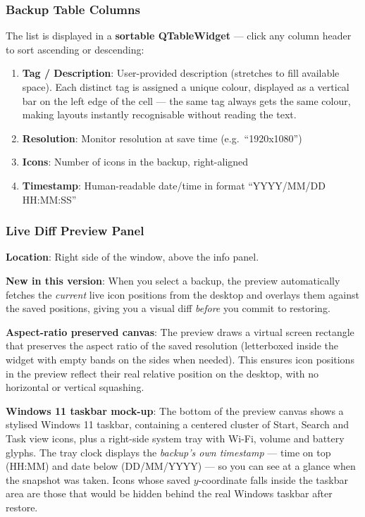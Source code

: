 \documentclass[a4paper,11pt]{article}
\begin{document}
\subsubsection{Backup Table Columns}

The list is displayed in a \textbf{sortable QTableWidget} --- click any
column header to sort ascending or descending:

\begin{enumerate}
  \item \textbf{Tag / Description}: User-provided description
    (stretches to fill available space). Each distinct tag is assigned a
    unique colour, displayed as a vertical bar on the left edge of the cell
    --- the same tag always gets the same colour, making layouts instantly
    recognisable without reading the text.
  \item \textbf{Resolution}: Monitor resolution at save time
    (e.g.\ ``1920x1080'')
  \item \textbf{Icons}: Number of icons in the backup, right-aligned
  \item \textbf{Timestamp}: Human-readable date/time in format
    ``YYYY/MM/DD HH:MM:SS''
\end{enumerate}

\subsubsection{Live Diff Preview Panel}

\textbf{Location}: Right side of the window, above the info panel.

\textbf{New in this version}: When you select a backup, the preview
automatically fetches the \textit{current} live icon positions from the
desktop and overlays them against the saved positions, giving you a
visual diff \textit{before} you commit to restoring.

\textbf{Aspect-ratio preserved canvas}: The preview draws a
virtual screen rectangle that preserves the aspect ratio of the saved
resolution (letterboxed inside the widget with empty bands on the sides
when needed). This ensures icon positions in the preview reflect their
real relative position on the desktop, with no horizontal or vertical
squashing.

\textbf{Windows 11 taskbar mock-up}: The bottom of the preview
canvas shows a stylised Windows 11 taskbar, containing a centered cluster
of Start, Search and Task view icons, plus a right-side system tray with
Wi-Fi, volume and battery glyphs. The tray clock displays the
\textit{backup's own timestamp} --- time on top (HH:MM) and date below
(DD/MM/YYYY) --- so you can see at a glance when the snapshot was taken.
Icons whose saved $y$-coordinate falls inside the taskbar area are those
that would be hidden behind the real Windows taskbar after restore.
\end{document}

